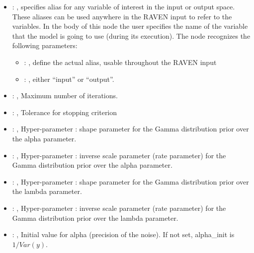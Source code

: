 \begin{itemize}
    \item {}: , 
      specifies alias for         any variable of interest in the input or output space. These
      aliases can be used anywhere in the RAVEN input to         refer to the variables. In the body
      of this node the user specifies the name of the variable that the model is going to use
      (during its execution).
      The  node recognizes the following parameters:
        \begin{itemize}
          \item {}: , 
            define the actual alias, usable throughout the RAVEN input
          \item {}: , 
            either ``input'' or ``output''.
      \end{itemize}

    \item {}: , 
      Maximum number of iterations.

    \item {}: , 
      Tolerance for stopping criterion

    \item {}: , 
      Hyper-parameter : shape parameter for the Gamma
      distribution prior over the alpha parameter.

    \item {}: , 
      Hyper-parameter : inverse scale parameter (rate parameter)
      for the Gamma distribution prior over the alpha parameter.

    \item {}: , 
      Hyper-parameter : shape parameter for the Gamma distribution
      prior over the lambda parameter.

    \item {}: , 
      Hyper-parameter : inverse scale parameter (rate parameter) for
      the Gamma distribution prior over the lambda parameter.

    \item {}: , 
      Initial value for alpha (precision of the noise).
      If not set, alpha\_init is $1/Var(y)$.


\end{itemize}
